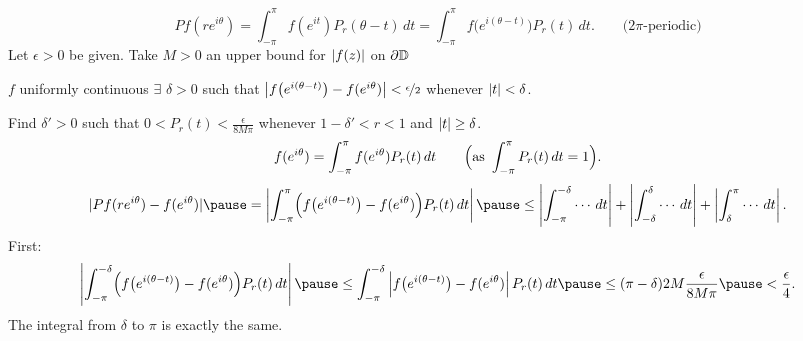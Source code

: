 \documentclass[10pt,aspectratio=169]{beamer}
\begin{document}
\begin{frame}
\[
Pf(re^{i\theta})
=
\int_{-\pi}^\pi f(e^{it}) P_r(\theta-t) \, dt
=
\int_{-\pi}^\pi f\bigl(e^{i(\theta-t)}\bigr) P_r(t) \, dt .
\qquad \text{($2\pi$-periodic)}
\]
\pause
Let $\epsilon > 0$ be given.
\pause
\quad
Take $M > 0$ an upper bound for 
$\lvert {f(z)} \rvert$ on $\partial {\mathbb{D}}$
\pause
\medskip

$f$ uniformly continuous \pause \wthus $\exists$ $\delta > 0$
such that $\left\lvert {f\bigl(e^{i(\theta-t)}\bigr)-f(e^{i\theta})} \right\rvert <
\nicefrac{\epsilon}{2}$ whenever $\lvert {t} \rvert < \delta$.

\pause
\medskip

Find 
$\delta' > 0$ such that
\quad $0 < P_r(t) < \frac{\epsilon}{8M\pi}$ \quad
whenever
$1-\delta' < r < 1$ and $\lvert {t} \rvert \geq \delta$.
\pause
\[
f(e^{i\theta})=
\int_{-\pi}^\pi f(e^{i\theta}) P_r(t) \, dt 
\qquad \Bigl(\text{as} \ \int_{-\pi}^\pi P_r(t) \, dt = 1\Bigr).
\]
\pause
\[
\sabs{
Pf(r e^{i\theta} ) - f(e^{i\theta})
}
\pause
=
\abs{
\int_{-\pi}^{\pi} \Bigl( f\bigl(e^{i(\theta-t)}\bigr)-f(e^{i\theta}) \Bigr) P_r(t) \, dt
}
\pause
\leq 
\abs{
\int_{-\pi}^{-\delta} \cdots \, dt
}
+
\abs{
\int_{-\delta}^{\delta} \cdots \, dt
}
+
\abs{
\int_{\delta}^\pi \cdots \, dt
} .
\]
\pause
First:
\begin{equation*}
\abs{
\int_{-\pi}^{-\delta} \Bigl( f\bigl(e^{i(\theta-t)}\bigr)-f(e^{i\theta}) \Bigr) P_r(t) \, dt
}
\pause
\leq
\int_{-\pi}^{-\delta} \abs{ f\bigl(e^{i(\theta-t)}\bigr)-f(e^{i\theta}) }
P_r(t) \, dt
\pause
\leq (\pi-\delta) 2M \frac{\epsilon}{8M\pi}
\pause
< \frac{\epsilon}{4} .
\end{equation*}
\pause
The integral from $\delta$ to $\pi$ is exactly the same.
\end{frame}
\end{document}
